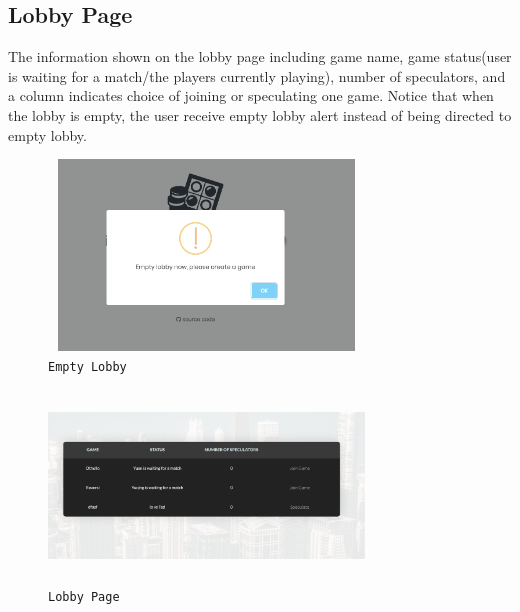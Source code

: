 \subsection{Lobby Page}
The information shown on the lobby page including game name, game status(user
is waiting for a match/the players currently playing), number of speculators,
and a column indicates choice of joining or speculating one game. Notice that 
when the lobby is empty, the user receive empty lobby alert instead of being
directed to empty lobby.
\begin{figure}[!htb]
\includegraphics[height=2.0in, width=3.3in]{lobby.png}
\caption{\texttt{Empty Lobby}}
\end{figure}
\begin{figure}[!htb]
\includegraphics[height=2.0in, width=3.3in]{lobby2.png}
\caption{\texttt{Lobby Page}}
\end{figure}

